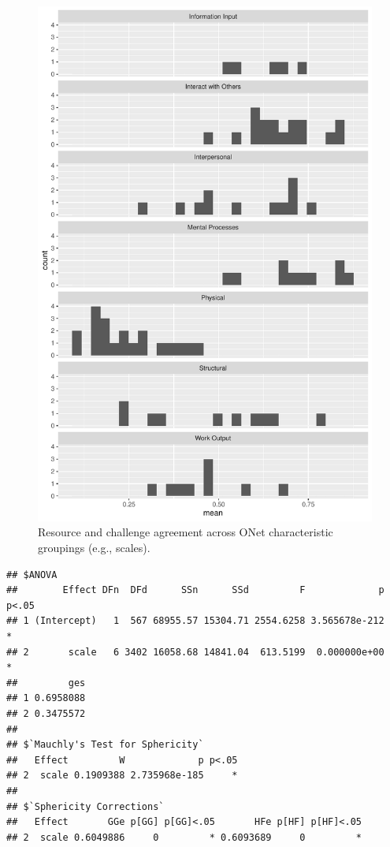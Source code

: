 \documentclass[
  man]{apa6}
\begin{document}
\begin{figure}
\centering
\includegraphics{SIOP2024convergence_files/figure-latex/recchall-1.pdf}
\caption{\label{fig:recchall}Resource and challenge agreement across ONet characteristic groupings (e.g., scales).}
\end{figure}

\begin{verbatim}
## $ANOVA
##        Effect DFn  DFd      SSn      SSd         F             p p<.05
## 1 (Intercept)   1  567 68955.57 15304.71 2554.6258 3.565678e-212     *
## 2       scale   6 3402 16058.68 14841.04  613.5199  0.000000e+00     *
##         ges
## 1 0.6958088
## 2 0.3475572
## 
## $`Mauchly's Test for Sphericity`
##   Effect         W             p p<.05
## 2  scale 0.1909388 2.735968e-185     *
## 
## $`Sphericity Corrections`
##   Effect       GGe p[GG] p[GG]<.05       HFe p[HF] p[HF]<.05
## 2  scale 0.6049886     0         * 0.6093689     0         *
\end{verbatim}
\end{document}
